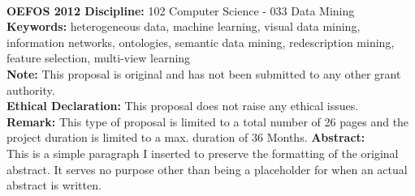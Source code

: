 \documentclass[a4paper,11pt]{article}
\begin{document}
\\[0,3cm]
%
%
{\bf OEFOS 2012 Discipline:} 102 Computer Science - 033  Data Mining 
\\[0,2cm]
{\bf Keywords:} heterogeneous data, machine learning, visual data mining,
information networks, ontologies, semantic data mining, redescription mining, feature selection, multi-view learning 
\\[0,2cm]
{\bf Note:} This proposal is original and has not been submitted to any other grant authority.
\\[0,2cm]
{\bf Ethical Declaration:} This proposal does not raise any ethical issues.
\\[0,2cm]
{\bf Remark:} This type of proposal is limited to a total number of 26 pages and the project duration is limited to a max. duration of 36 Months.
\newpage
%
%
{\bf Abstract:}
\\[0,2cm]
This is a simple paragraph I inserted to preserve the formatting of the original abstract. It serves no purpose other than being a placeholder for when an actual abstract is written. 
\\[0,2cm]
\end{document}
